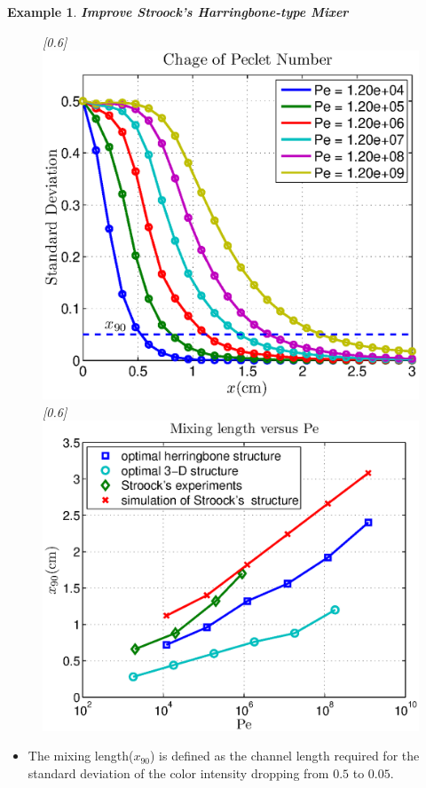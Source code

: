 \documentclass[dvips,landscape]{foils}
\newtheorem{example}{Example}
\begin{document}
\begin{example}{\bfseries Improve Stroock's Harringbone-type Mixer}
  \begin{figure}
    \centerline{
       \scalebox{0.6}[0.6]{\includegraphics{example2veryPe2}}
       \scalebox{0.6}[0.6]{\includegraphics{example2mixinglength2}}
    }
  \end{figure}
\end{example}
\begin{itemize}\setlength{\parskip}{0pt}  \setlength{\itemsep}{10pt} \setlength{\topsep}{0pt}
\item The mixing length($x_{90}$) is defined as the channel length required for the standard deviation of the color intensity dropping from $0.5$ to $0.05$. 
\end{itemize}
\end{document}
